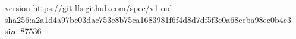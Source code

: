 version https://git-lfs.github.com/spec/v1
oid sha256:a2a1d4a97bc03dac753c8b75ca1683981f6f4d8d7df5f3c0a68ecba98ec0b4c3
size 87536
